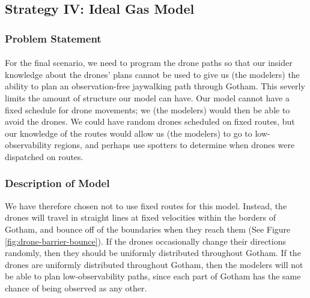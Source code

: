 \documentclass{article}
\begin{document}
\subsection{Strategy IV: Ideal Gas Model}

\subsubsection{Problem Statement}

\paragraph{}
For the final scenario, we need to program the drone paths so that our insider
	knowledge about the drones' plans cannot be used to give us (the modelers)
	the ability to plan an observation-free jaywalking path through Gotham.
This severly limits the amount of structure our model can have.
Our model cannot have a fixed schedule for drone movements;
	we (the modelers) would then be able to avoid the drones.
We could have random drones scheduled on fixed routes, but our knowledge of the
	routes would allow us (the modelers) to go to low-observability regions,
	and perhaps use spotters to determine when drones were dispatched on routes.

\subsubsection{Description of Model}

We have therefore chosen not to use fixed routes for this model.
Instead, the drones will travel in straight lines at fixed velocities within 
	the borders of Gotham, and bounce off of the boundaries when they reach them  
	(See Figure \ref{fig:drone-barrier-bounce}).
If the drones occasionally change their directions randomly, then they should
	be uniformly distributed throughout Gotham.
If the drones are uniformly distributed throughout Gotham, then the modelers
	will not be able to plan low-observability paths, since each part
	of Gotham has the same chance of being observed as any other.
\end{document}
